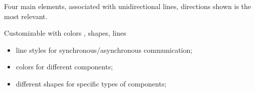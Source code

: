 Four main elements, associated with unidirectional lines, directions shown is the most relevant.

Customizable with colors , shapes, lines
\begin{itemize}
  \item line styles for synchronous/asynchronous communication;
  \item colors for different components;
  \item different shapes for specific types of components;
\end{itemize}







